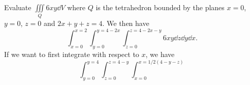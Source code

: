 \begin{itemize}
\begin{example}
        Evaluate $\iiint\limits_Q 6xy \dd{V}$ where $Q$ is the tetrahedron bounded by the planes $x=0$, $y=0$, $z=0$ and $2x+y+z=4$. We then have 
        \begin{equation}
            \int_{x=0}^{x=2}\int_{y=0}^{y=4-2x}\int_{z=0}^{z=4-2x-y} 6xy \dd{z}\dd{y}\dd{x}.
        \end{equation}
        If we want to first integrate with respect to $x$, we have 
        \begin{equation}
            \int_{y=0}^{y=4}\int_{z=0}^{z=4-y}\int_{x=0}^{x=1/2(4-y-z)}
        \end{equation}
    \end{example}
\end{itemize}